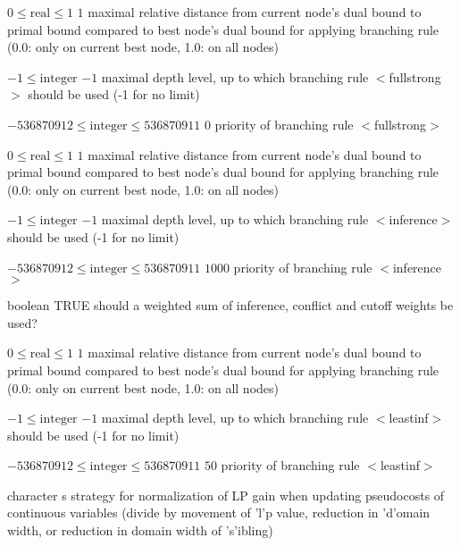 %
{$0\leq\textrm{real}\leq1$}%
{$1$}%
{maximal relative distance from current node's dual bound to primal bound compared to best node's dual bound for applying branching rule (0.0: only on current best node, 1.0: on all nodes)}%
{}

%
{$-1\leq\textrm{integer}$}%
{$-1$}%
{maximal depth level, up to which branching rule $<$fullstrong$>$ should be used (-1 for no limit)}%
{}

%
{$-536870912\leq\textrm{integer}\leq536870911$}%
{$0$}%
{priority of branching rule $<$fullstrong$>$}%
{}

%
{$0\leq\textrm{real}\leq1$}%
{$1$}%
{maximal relative distance from current node's dual bound to primal bound compared to best node's dual bound for applying branching rule (0.0: only on current best node, 1.0: on all nodes)}%
{}

%
{$-1\leq\textrm{integer}$}%
{$-1$}%
{maximal depth level, up to which branching rule $<$inference$>$ should be used (-1 for no limit)}%
{}

%
{$-536870912\leq\textrm{integer}\leq536870911$}%
{$1000$}%
{priority of branching rule $<$inference$>$}%
{}

%
{boolean}%
{TRUE}%
{should a weighted sum of inference, conflict and cutoff weights be used?}%
{}

%
{$0\leq\textrm{real}\leq1$}%
{$1$}%
{maximal relative distance from current node's dual bound to primal bound compared to best node's dual bound for applying branching rule (0.0: only on current best node, 1.0: on all nodes)}%
{}

%
{$-1\leq\textrm{integer}$}%
{$-1$}%
{maximal depth level, up to which branching rule $<$leastinf$>$ should be used (-1 for no limit)}%
{}

%
{$-536870912\leq\textrm{integer}\leq536870911$}%
{$50$}%
{priority of branching rule $<$leastinf$>$}%
{}

%
{character}%
{s}%
{strategy for normalization of LP gain when updating pseudocosts of continuous variables (divide by movement of 'l'p value, reduction in 'd'omain width, or reduction in domain width of 's'ibling)}%
{}

